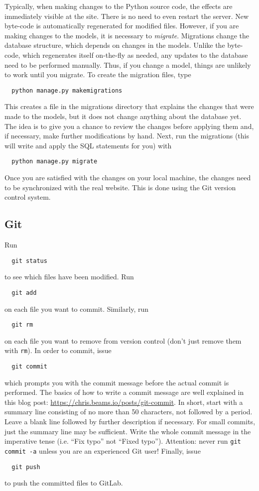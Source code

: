 \documentclass{article}
\begin{document}
Typically, when making changes to the Python source code, the effects are immediately visible at the site. There is no need to even restart the server. New byte-code is automatically regenerated for modified files. However, if you are making changes to the models, it is necessary to \textit{migrate}. Migrations change the database structure, which depends on changes in the models. Unlike the byte-code, which regenerates itself on-the-fly as needed, any updates to the database need to be performed manually. Thus, if you change a model, things are unlikely to work until you migrate. To create the migration files, type
\begin{lstlisting}
  python manage.py makemigrations
\end{lstlisting}
This creates a file in the migrations directory that explains the changes that were made to the models, but it does not change anything about the database yet. The idea is to give you a chance to review the changes before applying them and, if necessary, make further modifications by hand. Next, run the migrations (this will write and apply the SQL statements for you) with
\begin{lstlisting}
  python manage.py migrate
\end{lstlisting}

Once you are satisfied with the changes on your local machine, the changes
need to be synchronized with the real website. This is done using the Git version control system.

\subsection{Git}

Run
\begin{lstlisting}
  git status
\end{lstlisting}
to see which files have been modified. Run
\begin{lstlisting}
  git add
\end{lstlisting}
on each file you want to commit. Similarly, run
\begin{lstlisting}
  git rm
\end{lstlisting}
on each file you want to remove from version control (don't just remove them with \texttt{rm}).
In order to commit, issue
\begin{lstlisting}
  git commit
\end{lstlisting}
which prompts you with the commit message before the actual commit is performed. The basics of how to write a commit message are well explained in this blog post: \url{https://chris.beams.io/posts/git-commit}. In short, start with a summary line consisting of no more than 50 characters, not followed by a period. Leave a blank line followed by further description if necessary. For small commits, just the summary line may be sufficient. Write the whole commit message in the imperative tense (i.e. ``Fix typo'' not ``Fixed typo''). Attention: never run \verb+git commit -a+ unless you are an experienced Git user! Finally, issue
\begin{lstlisting}
  git push
\end{lstlisting}
to push the committed files to GitLab.
\end{document}
